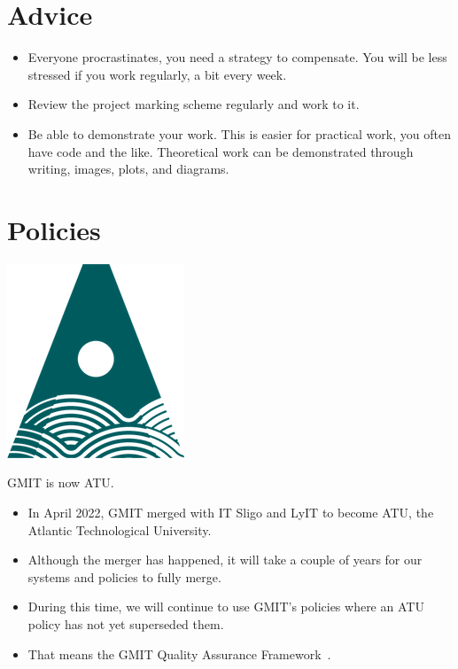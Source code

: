 \documentclass{iansnotes}
\begin{document}
\section{Advice}
\begin{itemize}
  \item Everyone procrastinates, you need a strategy to compensate. You will be less stressed if you work regularly, a bit every week.
  \item Review the project marking scheme regularly and work to it.
  \item Be able to demonstrate your work. This is easier for practical work, you often have code and the like. Theoretical work can be demonstrated through writing, images, plots, and diagrams.
\end{itemize}


\section{Policies}
\begin{marginfigure}%
  \centering
  \includegraphics[width=0.6\linewidth]{img/atu-green.png}
  \caption*{GMIT is now ATU.}
  \label{fig:atulogo}
\end{marginfigure}

\begin{itemize}
  \item In April 2022, GMIT merged with IT Sligo and LyIT to become ATU, the Atlantic Technological University.
  \item Although the merger has happened, it will take a couple of years for our systems and policies to fully merge.
  \item During this time, we will continue to use GMIT's policies where an ATU policy has not yet superseded them.
  \item That means the GMIT Quality Assurance Framework~\autocite{gmitqaf}.
\end{itemize} 
\end{document}
